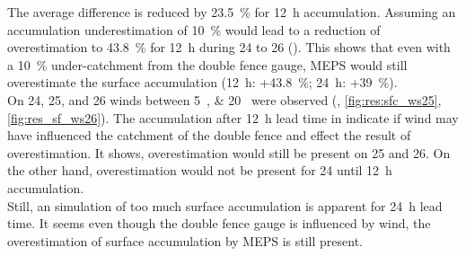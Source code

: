 The average difference is reduced by \SI{23.5}{\percent} for \SI{12}{\hour} accumulation. Assuming an accumulation underestimation of \SI{10}{\percent} would lead to a reduction of overestimation to \SI{43.8}{\percent} for \SI{12}{\hour} during \num{24} to \SI{26}{\dec} ().
This shows that even with a \SI{10}{\percent} under-catchment from the double fence gauge, MEPS would still overestimate the surface accumulation (\SI{12}{\hour}: +\SI{43.8}{\percent}; \SI{24}{\hour}: +\SI{39}{\percent}). 
\\
On \num{24}, \num{25}, and \SI{26}{\dec} winds between \SIlist{5;20}{\mPs} were observed (, \ref{fig:res:sfc_ws25}, \ref{fig:res_sf_ws26}). The accumulation after \SI{12}{\hour} lead time in  indicate if wind may have influenced the catchment of the double fence and effect the result of overestimation. It shows, overestimation would still be present on \num{25} and \SI{26}{\dec}. On the other hand, overestimation would not be present for \SI{24}{\dec} until \SI{12}{\hour} accumulation.
\\
Still, an simulation of too much surface accumulation is apparent for \SI{24}{\hour} lead time.
It seems even though the double fence gauge is influenced by wind, the overestimation of surface accumulation by MEPS is still present. 
